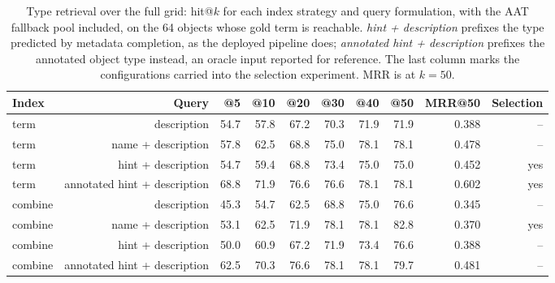 \begin{table}[t]
\centering
\small
\begin{tabular}{lrrrrrrrrr}
\toprule
Index & Query & @5 & @10 & @20 & @30 & @40 & @50 & MRR@50 & Selection \\
\midrule
term & description & 54.7 & 57.8 & 67.2 & 70.3 & 71.9 & 71.9 & 0.388 & -- \\
term & name + description & 57.8 & 62.5 & 68.8 & 75.0 & 78.1 & 78.1 & 0.478 & -- \\
term & hint + description & 54.7 & 59.4 & 68.8 & 73.4 & 75.0 & 75.0 & 0.452 & yes \\
term & annotated hint + description & 68.8 & 71.9 & 76.6 & 76.6 & 78.1 & 78.1 & 0.602 & yes \\
combine & description & 45.3 & 54.7 & 62.5 & 68.8 & 75.0 & 76.6 & 0.345 & -- \\
combine & name + description & 53.1 & 62.5 & 71.9 & 78.1 & 78.1 & 82.8 & 0.370 & yes \\
combine & hint + description & 50.0 & 60.9 & 67.2 & 71.9 & 73.4 & 76.6 & 0.388 & -- \\
combine & annotated hint + description & 62.5 & 70.3 & 76.6 & 78.1 & 78.1 & 79.7 & 0.481 & -- \\
\bottomrule
\end{tabular}
\caption{Type retrieval over the full grid: hit@$k$ for each index strategy and query formulation, with the AAT fallback pool included, on the 64 objects whose gold term is reachable. \emph{hint + description} prefixes the type predicted by metadata completion, as the deployed pipeline does; \emph{annotated hint + description} prefixes the annotated object type instead, an oracle input reported for reference. The last column marks the configurations carried into the selection experiment. MRR is at $k=50$.}
\label{tab:retrieval_grid}
\end{table}
